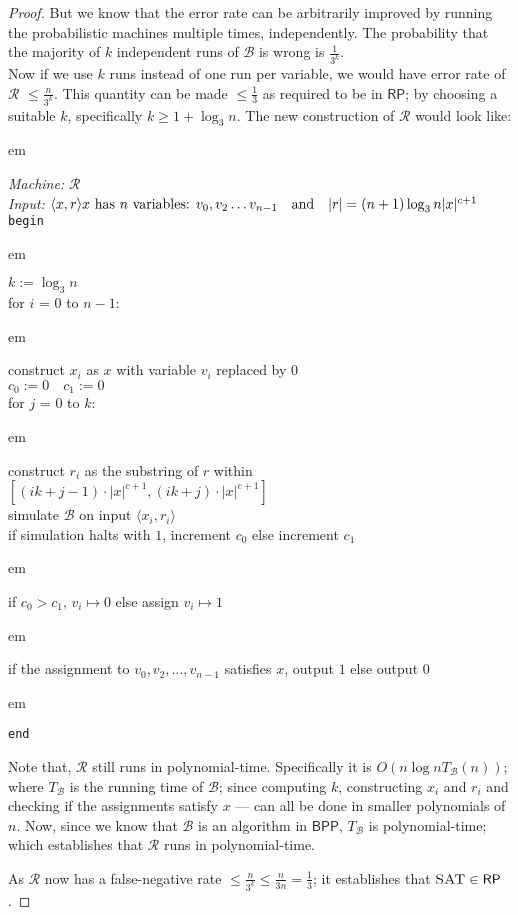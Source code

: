 \documentclass[usletter]{article}
\newcommand {\machine}[1]      {\ensuremath{\mathscr{#1}}}
\newcommand {\namedlangset}[1] {\ensuremath{\textnormal{\textsc{#1}}}}
\newcommand {\family}[1]       {\ensuremath{\mathsf{#1}}}
\newcommand {\indpar}[1]   {
  \par\leftskip=#1em
  \noindent\ignorespaces
}
\newenvironment{turing}[2] {
  \smallskip
  \indpar{2}
  \textit{Machine:} #1\\
  \textit{Input:} $#2$\\[5pt]
  \texttt{begin}
  \parskip=0pt
  \indpar{3}
}{
  \indpar{2}
  \texttt{end}
  \par\medskip
}
\newcommand {\RP}     {\family{RP}}
\newcommand {\BPP}    {\family{BPP}}
\begin{document}
\begin{enumerate}[labelsep=2.5em, label=\textbf{\arabic{enumi}}]
\begin{proof}
    But we know that the error rate can be arbitrarily improved by running the
    probabilistic machines multiple times, independently. The probability that
    the majority of $k$ independent runs of \machine{B} is wrong is
    $\frac{1}{3^k}$. \\
    Now if we use $k$ runs instead of one run per variable, we would have error
    rate of \machine{R} $\leq \frac{n}{3^k}$. This quantity can be made
    $\leq \frac{1}{3}$ as required to be in \RP; by choosing a suitable $k$,
    specifically $k \geq 1 + \log_3{n}$. The new construction of \machine{R}
    would look like:
    \begin{turing}
          {\machine{R}}
          {\langle x, r \rangle
            \hfill x \text{ has } n \text{ variables: } v_0, v_2 \ldots v_{n-1}
            \quad \text{and} \quad |r| = (n+1)\log_3{n}|x|^{c+1}}
      $k := \log_3{n}$ \\
      for $i$ = $0$ to $n-1$:
        \indpar{4}
        construct $x_i$ as $x$ with variable $v_i$ replaced by $0$ \\
        $c_0 := 0 \quad c_1 := 0$ \\
        for $j$ = $0$ to $k$:
          \indpar{5}
          construct $r_i$ as the substring of $r$ within
            $[(ik+j-1) \cdot |x|^{c+1}, (ik+j) \cdot |x|^{c+1}]$ \\
          simulate \machine{B} on input $\langle x_i, r_i \rangle$ \\
          if simulation halts with $1$, increment $c_0$ else increment $c_1$
        \indpar{4}
        if $c_0 > c_1$, $v_i \mapsto 0$ else assign $v_i \mapsto 1$
      \indpar{3}
      if the assignment to $v_0, v_2, \ldots , v_{n-1}$ satisfies $x$,
        output $1$ else output $0$
    \end{turing}

    Note that, \machine{R} still runs in polynomial-time. Specifically it is
    $O(n\log{n}T_\machine{B}(n))$; where $T_\machine{B}$ is the running time of
    \machine{B}; since computing $k$, constructing $x_i$ and $r_i$ and checking
    if the assignments satisfy $x$ --- can all be done in smaller polynomials of
    $n$. Now, since we know that \machine{B} is an algorithm in \BPP,
    $T_\machine{B}$ is polynomial-time; which establishes that \machine{R} runs
    in polynomial-time.

    As \machine{R} now has a false-negative rate $\leq \frac{n}{3^k} \leq
    \frac{n}{3n} = \frac{1}{3}$; it establishes that
    $\namedlangset{SAT} \in \RP$.
  \end{proof}



\end{enumerate}
\end{document}
